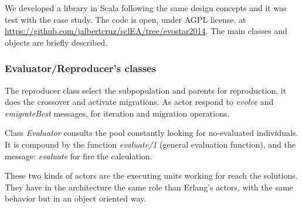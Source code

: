 
We developed a library in Scala following the same design concepts and it was test with the case study. The code is open, under AGPL license, at \url{https://github.com/jalbertcruz/sclEA/tree/evostar2014}. The main classes and objects are briefly described.

\subsubsection{Evaluator/Reproducer's classes}

The reproducer class select the subpopulation and parents for reproduction, it does the crossover and activate migrations. As actor respond to {\em evolve} and {\em emigrateBest} messages, for iteration and migration operations.

Class {\em Evaluator} consults the pool constantly looking for no-evaluated individuals. It is compound by the function {\em evaluate/1} (general evaluation function), and the message: {\em evaluate} for fire the calculation.

These two kinds of actors are the executing units working for reach the solutions. They have in the architecture the same role than Erlang’s actors, with the same behavior but in an object oriented way.
%
%
%
%
%
%
%
%
%
